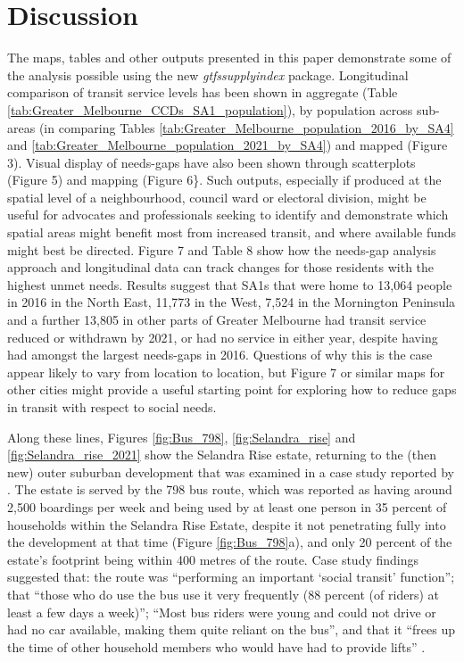 \documentclass[preprint, 3p,
authoryear]{elsarticle} %
\begin{document}
\section{Discussion}\label{discussion}

The maps, tables and other outputs presented in this paper demonstrate
some of the analysis possible using the new \emph{gtfssupplyindex}
package. Longitudinal comparison of transit service levels has been
shown in aggregate (Table
\ref{tab:Greater_Melbourne_CCDs_SA1_population}), by population across
sub-areas (in comparing Tables
\ref{tab:Greater_Melbourne_population_2016_by_SA4} and
\ref{tab:Greater_Melbourne_population_2021_by_SA4}) and mapped (Figure
3). Visual display of needs-gaps have also been shown through
scatterplots (Figure 5) and mapping (Figure 6\}. Such outputs,
especially if produced at the spatial level of a neighbourhood, council
ward or electoral division, might be useful for advocates and
professionals seeking to identify and demonstrate which spatial areas
might benefit most from increased transit, and where available funds
might best be directed. Figure 7 and Table 8 show how the needs-gap
analysis approach and longitudinal data can track changes for those
residents with the highest unmet needs. Results suggest that SA1s that
were home to 13,064 people in 2016 in the North East, 11,773 in the
West, 7,524 in the Mornington Peninsula and a further 13,805 in other
parts of Greater Melbourne had transit service reduced or withdrawn by
2021, or had no service in either year, despite having had amongst the
largest needs-gaps in 2016. Questions of why this is the case appear
likely to vary from location to location, but Figure 7 or similar maps
for other cities might provide a useful starting point for exploring how
to reduce gaps in transit with respect to social needs.

Along these lines, Figures \ref{fig:Bus_798}, \ref{fig:Selandra_rise}
and \ref{fig:Selandra_rise_2021} show the Selandra Rise estate,
returning to the (then new) outer suburban development that was examined
in a case study reported by \citet{delbosc2015impact}. The estate is
served by the 798 bus route, which was reported as having around 2,500
boardings per week and being used by at least one person in 35 percent
of households within the Selandra Rise Estate, despite it not
penetrating fully into the development at that time (Figure
\ref{fig:Bus_798}a), and only 20 percent of the estate's footprint being
within 400 metres of the route. Case study findings suggested that: the
route was ``performing an important `social transit' function''; that
``those who do use the bus use it very frequently (88 percent (of
riders) at least a few days a week)''; ``Most bus riders were young and
could not drive or had no car available, making them quite reliant on
the bus'', and that it ``frees up the time of other household members
who would have had to provide lifts'' \citep[p.10]{delbosc2015impact}.
\end{document}
